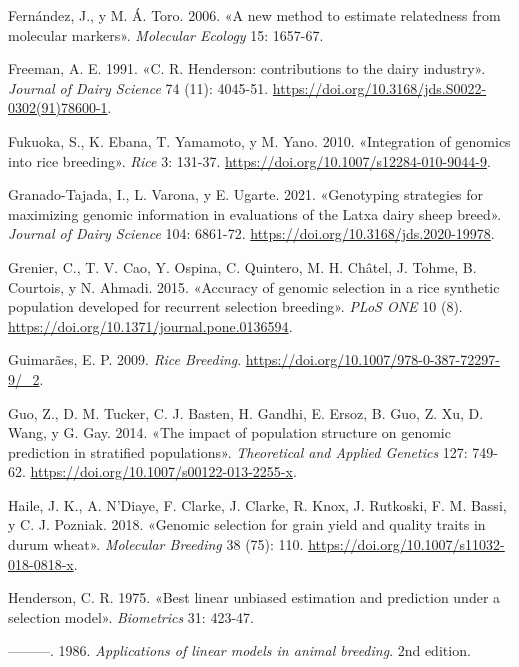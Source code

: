 \documentclass[11pt,spanish,a4paper,oneside,]{book} %
\begin{document}
\leavevmode\hypertarget{ref-cite:24}{}%
Fernández, J., y M. Á. Toro. 2006. «A new method to estimate relatedness from molecular markers». \emph{Molecular Ecology} 15: 1657-67.

\leavevmode\hypertarget{ref-cite:28}{}%
Freeman, A. E. 1991. «C. R. Henderson: contributions to the dairy industry». \emph{Journal of Dairy Science} 74 (11): 4045-51. \url{https://doi.org/10.3168/jds.S0022-0302(91)78600-1}.

\leavevmode\hypertarget{ref-cite:61}{}%
Fukuoka, S., K. Ebana, T. Yamamoto, y M. Yano. 2010. «Integration of genomics into rice breeding». \emph{Rice} 3: 131-37. \url{https://doi.org/10.1007/s12284-010-9044-9}.

\leavevmode\hypertarget{ref-cite:88}{}%
Granado-Tajada, I., L. Varona, y E. Ugarte. 2021. «Genotyping strategies for maximizing genomic information in evaluations of the Latxa dairy sheep breed». \emph{Journal of Dairy Science} 104: 6861-72. \url{https://doi.org/10.3168/jds.2020-19978}.

\leavevmode\hypertarget{ref-cite:65}{}%
Grenier, C., T. V. Cao, Y. Ospina, C. Quintero, M. H. Châtel, J. Tohme, B. Courtois, y N. Ahmadi. 2015. «Accuracy of genomic selection in a rice synthetic population developed for recurrent selection breeding». \emph{PLoS ONE} 10 (8). \url{https://doi.org/10.1371/journal.pone.0136594}.

\leavevmode\hypertarget{ref-cite:62}{}%
Guimarães, E. P. 2009. \emph{Rice Breeding}. \url{https://doi.org/10.1007/978-0-387-72297-9/_2}.

\leavevmode\hypertarget{ref-cite:70}{}%
Guo, Z., D. M. Tucker, C. J. Basten, H. Gandhi, E. Ersoz, B. Guo, Z. Xu, D. Wang, y G. Gay. 2014. «The impact of population structure on genomic prediction in stratified populations». \emph{Theoretical and Applied Genetics} 127: 749-62. \url{https://doi.org/10.1007/s00122-013-2255-x}.

\leavevmode\hypertarget{ref-cite:81}{}%
Haile, J. K., A. N'Diaye, F. Clarke, J. Clarke, R. Knox, J. Rutkoski, F. M. Bassi, y C. J. Pozniak. 2018. «Genomic selection for grain yield and quality traits in durum wheat». \emph{Molecular Breeding} 38 (75): 110. \url{https://doi.org/10.1007/s11032-018-0818-x}.

\leavevmode\hypertarget{ref-cite:41}{}%
Henderson, C. R. 1975. «Best linear unbiased estimation and prediction under a selection model». \emph{Biometrics} 31: 423-47.

\leavevmode\hypertarget{ref-cite:67}{}%
---------. 1986. \emph{Applications of linear models in animal breeding}. 2nd edition.
\end{document}
